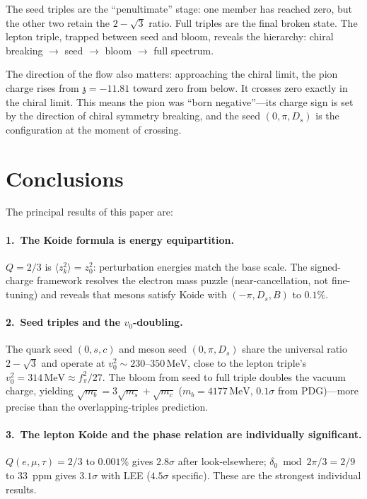 \documentclass[12pt,a4paper]{article}
\newcommand{\MeV}{\,\text{MeV}}
\newcommand{\fpi}{f_\pi}
\newcommand{\zch}{\mathfrak{z}}
\begin{document}
The seed triples are the ``penultimate'' stage: one member has
reached zero, but the other two retain the $2 - \sqrt{3}$ ratio.
Full triples are the final broken state. The lepton triple,
trapped between seed and bloom, reveals the hierarchy:
chiral breaking $\to$ seed $\to$ bloom $\to$ full spectrum.

The direction of the flow also matters: approaching the chiral
limit, the pion charge rises from $\zch = -11.81$ toward zero
from below. It crosses zero exactly in the chiral limit. This
means the pion was ``born negative''---its charge sign is set by
the direction of chiral symmetry breaking, and the seed
$(0, \pi, D_s)$ is the configuration at the moment of crossing.

\section{Conclusions}

The principal results of this paper are:

\paragraph{1.\ The Koide formula is energy equipartition.}
$Q = 2/3$ is $\langle z_k^2\rangle = z_0^2$: perturbation energies
match the base scale. The signed-charge framework resolves the
electron mass puzzle (near-cancellation, not fine-tuning) and reveals
that mesons satisfy Koide with $(-\pi, D_s, B)$ to $0.1\%$.

\paragraph{2.\ Seed triples and the $v_0$-doubling.}
The quark seed $(0,s,c)$ and meson seed $(0,\pi,D_s)$ share the
universal ratio $2 - \sqrt{3}$ and operate at $v_0^2 \sim
230$--$350\MeV$, close to the lepton triple's $v_0^2 = 314\MeV
\approx \fpi^2/27$. The bloom from seed to full triple doubles the
vacuum charge, yielding $\sqrt{m_b} = 3\sqrt{m_s} + \sqrt{m_c}$
($m_b = 4177\MeV$, $0.1\sigma$ from PDG)---more precise than the
overlapping-triples prediction.

\paragraph{3.\ The lepton Koide and the phase relation are
individually significant.}
$Q(e,\mu,\tau) = 2/3$ to $0.001\%$ gives $2.8\sigma$ after look-elsewhere;
$\delta_0 \bmod 2\pi/3 = 2/9$ to 33~ppm gives $3.1\sigma$ with LEE
($4.5\sigma$ specific). These are the strongest individual results.
\end{document}
